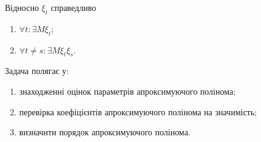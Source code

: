 Відносно $\xi_t$ справедливо
\begin{enumerate}
	\item $\forall t:\exists M\xi_t$;
	\item $\forall t\ne s:\exists M\xi_t\xi_s$.
\end{enumerate}
Задача полягає у:
\begin{enumerate}
	\item знаходженні оцінок параметрів апроксимуючого полінома;
	\item перевірка коефіцієнтів апроксимуючого полінома на значимість;
	\item визначити порядок апроксимуючого полінома.
\end{enumerate}